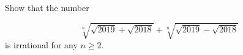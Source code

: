 Show that the number

\[\sqrt[n]{\sqrt{2019} + \sqrt{2018}} + \sqrt[n]{\sqrt{2019} - \sqrt{2018}}\]
is irrational for any $n\ge 2$.